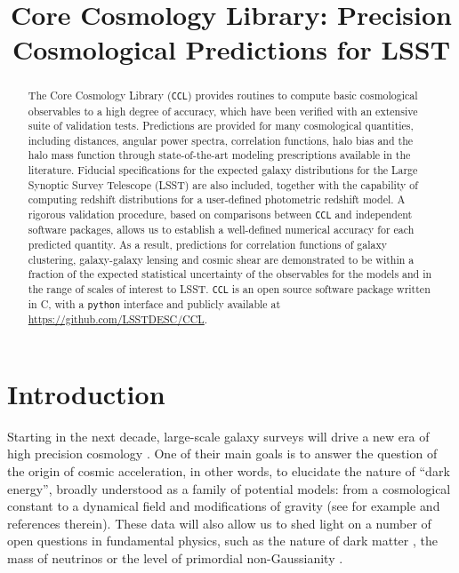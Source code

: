 \documentclass[\docopts]{\docclass}
\newcommand{\ccl}{{\tt CCL}\xspace}
\begin{document}
\title{Core Cosmology Library: Precision Cosmological Predictions for LSST}

\maketitlepre

\begin{abstract}

The Core Cosmology Library (\ccl) provides routines to compute basic cosmological observables to a high degree of accuracy, which have been verified with an extensive suite of validation tests. Predictions are provided for many cosmological quantities, including distances, angular power spectra, correlation functions, halo bias and the halo mass function through state-of-the-art modeling prescriptions available in the literature. Fiducial specifications for the expected galaxy distributions for the Large Synoptic Survey Telescope (LSST) are also included, together with the capability of computing redshift distributions for a user-defined photometric redshift model. A rigorous validation procedure, based on comparisons between \ccl and independent software packages, allows us to establish a well-defined numerical accuracy for each predicted quantity. As a result, predictions for correlation functions of galaxy clustering, galaxy-galaxy lensing and cosmic shear are demonstrated to be within a fraction of the expected statistical uncertainty of the observables for the models and in the range of scales of interest to LSST. \ccl is an open source software package written in C, with a {\tt python} interface and publicly available at \url{https://github.com/LSSTDESC/CCL}. 

\end{abstract}

\maketitlepost



\section{Introduction}
\label{sec:intro}

Starting in the next decade, large-scale galaxy surveys will drive a new era of high precision cosmology \citep{DESCWhite,green11,Laureijs11}. One of their main goals is to answer the question of the origin of cosmic acceleration, in other words, to elucidate the nature of ``dark energy'', broadly understood as a family of potential models: from a cosmological constant to a dynamical field and modifications of gravity (see for example  \citealt{Carroll2001CC,Peebles2003,Padmanabhan2003,Copeland2006,Ishak2007,Weinberg13} and references therein). These data will also allow us to shed light on a number of open questions in fundamental physics, such as the nature of dark matter \citep{Feng10,Porter11}, the mass of neutrinos \citep{Wong11,Lesgourgues12,Allison15} or the level of primordial non-Gaussianity \citep{Dalal08,Desjacques10}.
\end{document}

